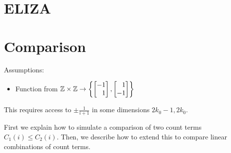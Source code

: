 
\section{ELIZA}


\section{Comparison}
\label{sec:assembly_comparison}


Assumptions:
\begin{itemize}
    \item Function from $\Z\times\Z\to \left\{\begin{bmatrix}
            -1\\\phantom- 1
        \end{bmatrix}, \begin{bmatrix}
            \phantom- 1\\-1
        \end{bmatrix}\right\}$
\end{itemize}

This requires access to $\pm\frac{1}{i+1}$ in some dimensions $2k_0-1,2k_0$.

    First we explain how to simulate a comparison of two count terms $C_1(i)\leq C_2(i)$. Then, we describe how to extend this to %
    compare linear combinations of count terms.

